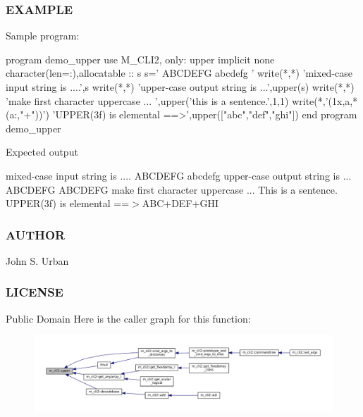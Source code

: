 \subsubsection*{E\+X\+A\+M\+P\+LE}

Sample program\+: \begin{DoxyVerb}program demo_upper
use M_CLI2, only: upper
implicit none
character(len=:),allocatable  :: s
   s=' ABCDEFG abcdefg '
   write(*,*) 'mixed-case input string is ....',s
   write(*,*) 'upper-case output string is ...',upper(s)
   write(*,*) 'make first character uppercase  ... ',upper('this is a sentence.',1,1)
   write(*,'(1x,a,*(a:,"+"))') 'UPPER(3f) is elemental ==>',upper(["abc","def","ghi"])
end program demo_upper
\end{DoxyVerb}


Expected output

mixed-\/case input string is .... A\+B\+C\+D\+E\+FG abcdefg upper-\/case output string is ... A\+B\+C\+D\+E\+FG A\+B\+C\+D\+E\+FG make first character uppercase ... This is a sentence. U\+P\+P\+E\+R(3f) is elemental ==$>$A\+B\+C+\+D\+E\+F+\+G\+HI \subsubsection*{A\+U\+T\+H\+OR}

John S. Urban \subsubsection*{L\+I\+C\+E\+N\+SE}

Public Domain Here is the caller graph for this function\+:\nopagebreak
\begin{figure}[H]
\begin{center}
\leavevmode
\includegraphics[width=350pt]{namespacem__cli2_afa7a2419002024ff6d950c5d905ddd7a_icgraph}
\end{center}
\end{figure}
\mbox{\label{namespacem__cli2_a1bbcefd886dabb0286e2cb14ab54034f}} 
